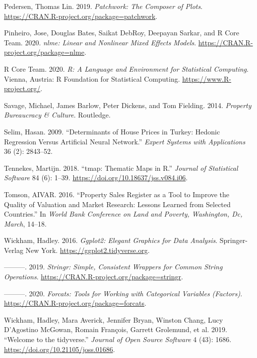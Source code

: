 \documentclass[conference,final,]{IEEEtran}
\begin{document}
\leavevmode\hypertarget{ref-R-patchwork}{}%
Pedersen, Thomas Lin. 2019. \emph{Patchwork: The Composer of Plots}. \url{https://CRAN.R-project.org/package=patchwork}.

\leavevmode\hypertarget{ref-R-nlme}{}%
Pinheiro, Jose, Douglas Bates, Saikat DebRoy, Deepayan Sarkar, and R Core Team. 2020. \emph{nlme: Linear and Nonlinear Mixed Effects Models}. \url{https://CRAN.R-project.org/package=nlme}.

\leavevmode\hypertarget{ref-R-base}{}%
R Core Team. 2020. \emph{R: A Language and Environment for Statistical Computing}. Vienna, Austria: R Foundation for Statistical Computing. \url{https://www.R-project.org/}.

\leavevmode\hypertarget{ref-savage2014property}{}%
Savage, Michael, James Barlow, Peter Dickens, and Tom Fielding. 2014. \emph{Property Bureaucracy \& Culture}. Routledge.

\leavevmode\hypertarget{ref-selim2009determinants}{}%
Selim, Hasan. 2009. ``Determinants of House Prices in Turkey: Hedonic Regression Versus Artificial Neural Network.'' \emph{Expert Systems with Applications} 36 (2): 2843--52.

\leavevmode\hypertarget{ref-R-tmap}{}%
Tennekes, Martijn. 2018. ``tmap: Thematic Maps in R.'' \emph{Journal of Statistical Software} 84 (6): 1--39. \url{https://doi.org/10.18637/jss.v084.i06}.

\leavevmode\hypertarget{ref-tomson2016property}{}%
Tomson, AIVAR. 2016. ``Property Sales Register as a Tool to Improve the Quality of Valuation and Market Research: Lessons Learned from Selected Countries.'' In \emph{World Bank Conference on Land and Poverty, Washington, Dc, March}, 14--18.

\leavevmode\hypertarget{ref-R-ggplot2}{}%
Wickham, Hadley. 2016. \emph{Ggplot2: Elegant Graphics for Data Analysis}. Springer-Verlag New York. \url{https://ggplot2.tidyverse.org}.

\leavevmode\hypertarget{ref-R-stringr}{}%
---------. 2019. \emph{Stringr: Simple, Consistent Wrappers for Common String Operations}. \url{https://CRAN.R-project.org/package=stringr}.

\leavevmode\hypertarget{ref-R-forcats}{}%
---------. 2020. \emph{Forcats: Tools for Working with Categorical Variables (Factors)}. \url{https://CRAN.R-project.org/package=forcats}.

\leavevmode\hypertarget{ref-R-tidyverse}{}%
Wickham, Hadley, Mara Averick, Jennifer Bryan, Winston Chang, Lucy D'Agostino McGowan, Romain François, Garrett Grolemund, et al. 2019. ``Welcome to the tidyverse.'' \emph{Journal of Open Source Software} 4 (43): 1686. \url{https://doi.org/10.21105/joss.01686}.
\end{document}
